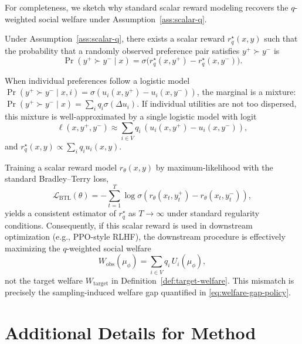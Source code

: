 \documentclass{article}
\theoremstyle{plain}
\theoremstyle{definition}
\theoremstyle{remark}
\begin{document}
For completeness, we sketch why standard scalar reward modeling recovers the
$q$-weighted social welfare under Assumption~\ref{ass:scalar-q}.

Under Assumption~\ref{ass:scalar-q}, there exists a scalar reward
$r_q^\star(x,y)$ such that the probability that a randomly observed
preference pair satisfies $y^+ \succ y^-$ is
\begin{equation}
    \Pr(y^+ \succ y^- \mid x)
    =
    \sigma\!\big(r_q^\star(x,y^+) - r_q^\star(x,y^-)\big).
\end{equation}

When individual preferences follow a logistic model
$\Pr(y^+ \succ y^- \mid x, i) = \sigma(u_i(x,y^+) - u_i(x,y^-))$, the marginal
is a mixture:
$\Pr(y^+ \succ y^- \mid x) = \sum_i q_i \sigma(\Delta u_i)$.
If individual utilities are not too dispersed, this mixture is
well-approximated by a single logistic model with logit
\begin{equation}
    \ell(x, y^+, y^-)
    \approx
    \sum_{i \in V} q_i \,
    \left( u_i(x,y^+) - u_i(x,y^-) \right),
\end{equation}
and $r_q^\star(x,y) \propto \sum_i q_i u_i(x,y)$.

Training a scalar reward model $r_\theta(x,y)$ by maximum-likelihood with the
standard Bradley--Terry loss,
\begin{equation}
    \mathcal{L}_{\text{BTL}}(\theta)
    =
    - \sum_{t=1}^T
    \log \sigma\!\left( r_\theta(x_t, y_t^+) - r_\theta(x_t, y_t^-) \right),
\end{equation}
yields a consistent estimator of $r_q^\star$ as $T \to \infty$ under standard
regularity conditions. Consequently, if this scalar reward is used in downstream
optimization (e.g., PPO-style RLHF), the downstream procedure is effectively maximizing the $q$-weighted social welfare
\begin{equation}
    W_{\text{obs}}(\mu_\phi)
    =
    \sum_{i \in V} q_i \, U_i(\mu_\phi),
\end{equation}
not the target welfare $W_{\text{target}}$ in
Definition~\ref{def:target-welfare}. This mismatch is precisely the
sampling-induced welfare gap quantified in \eqref{eq:welfare-gap-policy}.

\section{Additional Details for Method}
\label{app:method-details}
\end{document}
